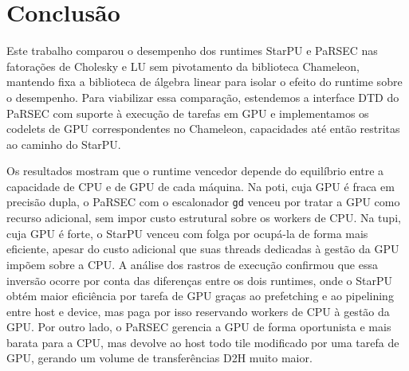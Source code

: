 \documentclass[12pt]{article}
\begin{document}
\section{Conclusão}

Este trabalho comparou o desempenho dos runtimes StarPU e PaRSEC nas fatorações de Cholesky e LU sem pivotamento da biblioteca Chameleon, mantendo fixa a biblioteca de álgebra linear para isolar o efeito do runtime sobre o desempenho. Para viabilizar essa comparação, estendemos a interface DTD do PaRSEC com suporte à execução de tarefas em GPU e implementamos os codelets de GPU correspondentes no Chameleon, capacidades até então restritas ao caminho do StarPU.

Os resultados mostram que o runtime vencedor depende do equilíbrio entre a capacidade de CPU e de GPU de cada máquina. Na poti, cuja GPU é fraca em precisão dupla, o PaRSEC com o escalonador \texttt{gd} venceu por tratar a GPU como recurso adicional, sem impor custo estrutural sobre os workers de CPU. Na tupi, cuja GPU é forte, o StarPU venceu com folga por ocupá-la de forma mais eficiente, apesar do custo adicional que suas threads dedicadas à gestão da GPU impõem sobre a CPU. A análise dos rastros de execução confirmou que essa inversão ocorre por conta das diferenças entre os dois runtimes, onde o StarPU obtém maior eficiência por tarefa de GPU graças ao prefetching e ao pipelining entre host e device, mas paga por isso reservando workers de CPU à gestão da GPU. Por outro lado, o PaRSEC gerencia a GPU de forma oportunista e mais barata para a CPU, mas devolve ao host todo tile modificado por uma tarefa de GPU, gerando um volume de transferências D2H muito maior.



\end{document}
